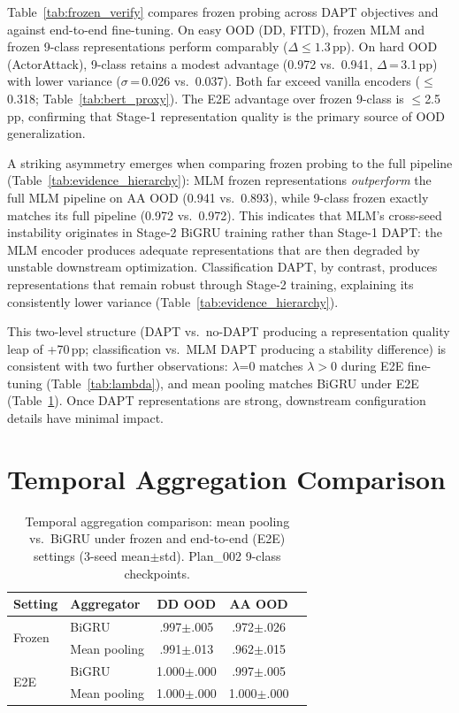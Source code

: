 Table~\ref{tab:frozen_verify} compares frozen probing across DAPT objectives and against end-to-end fine-tuning. On easy OOD (DD, FITD), frozen MLM and frozen 9-class representations perform comparably ($\Delta \leq 1.3$\,pp). On hard OOD (ActorAttack), 9-class retains a modest advantage (0.972 vs.\ 0.941, $\Delta$\,=\,3.1\,pp) with lower variance ($\sigma$\,=\,0.026 vs.\ 0.037). Both far exceed vanilla encoders ($\leq$0.318; Table~\ref{tab:bert_proxy}). The E2E advantage over frozen 9-class is $\leq$2.5\,pp, confirming that Stage-1 representation quality is the primary source of OOD generalization.

A striking asymmetry emerges when comparing frozen probing to the full pipeline (Table~\ref{tab:evidence_hierarchy}): MLM frozen representations \emph{outperform} the full MLM pipeline on AA OOD (0.941 vs.\ 0.893), while 9-class frozen exactly matches its full pipeline (0.972 vs.\ 0.972). This indicates that MLM's cross-seed instability originates in Stage-2 BiGRU training rather than Stage-1 DAPT: the MLM encoder produces adequate representations that are then degraded by unstable downstream optimization. Classification DAPT, by contrast, produces representations that remain robust through Stage-2 training, explaining its consistently lower variance (Table~\ref{tab:evidence_hierarchy}).

This two-level structure (DAPT vs.\ no-DAPT producing a representation quality leap of +70\,pp; classification vs.\ MLM DAPT producing a stability difference) is consistent with two further observations: $\lambda$=0 matches $\lambda > 0$ during E2E fine-tuning (Table~\ref{tab:lambda}), and mean pooling matches BiGRU under E2E (Table~\ref{tab:temporal}). Once DAPT representations are strong, downstream configuration details have minimal impact.

\section{Temporal Aggregation Comparison}
\label{app:temporal}

\begin{table}[ht]
\centering
\footnotesize
\caption{Temporal aggregation comparison: mean pooling vs.\ BiGRU under frozen and end-to-end (E2E) settings (3-seed mean$\pm$std). Plan\_002 9-class checkpoints.}
\label{tab:temporal}
\begin{tabular}{@{}llccc@{}}
\toprule
\textbf{Setting} & \textbf{Aggregator} & DD OOD & AA OOD \\
\midrule
\multirow{2}{*}{Frozen} & BiGRU & .997$\pm$.005 & .972$\pm$.026 \\
& Mean pooling & .991$\pm$.013 & .962$\pm$.015 \\
\midrule
\multirow{2}{*}{E2E} & BiGRU & 1.000$\pm$.000 & .997$\pm$.005 \\
& Mean pooling & 1.000$\pm$.000 & 1.000$\pm$.000 \\
\bottomrule
\end{tabular}
\end{table}

